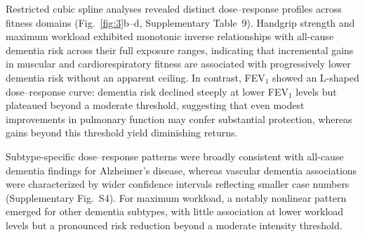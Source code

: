 \documentclass{article}
\begin{document}
Restricted cubic spline analyses revealed distinct dose--response profiles across fitness domains (Fig.~\ref{fig:3}b--d, Supplementary Table~9).
Handgrip strength and maximum workload exhibited monotonic inverse relationships with all-cause dementia risk across their full exposure ranges, indicating that incremental gains in muscular and cardiorespiratory fitness are associated with progressively lower dementia risk without an apparent ceiling.
In contrast, FEV$_1$ showed an L-shaped dose--response curve: dementia risk declined steeply at lower FEV$_1$ levels but plateaued beyond a moderate threshold, suggesting that even modest improvements in pulmonary function may confer substantial protection, whereas gains beyond this threshold yield diminishing returns.

Subtype-specific dose--response patterns were broadly consistent with all-cause dementia findings for Alzheimer's disease, whereas vascular dementia associations were characterized by wider confidence intervals reflecting smaller case numbers (Supplementary Fig.~S4).
For maximum workload, a notably nonlinear pattern emerged for other dementia subtypes, with little association at lower workload levels but a pronounced risk reduction beyond a moderate intensity threshold. %
\end{document}
